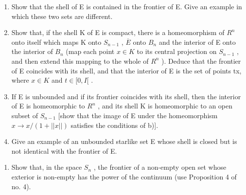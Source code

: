 \begin{enumerate}
\def\labelenumi{\alph{enumi})}
\item
  Show that the shell of E is contained in the frontier of E. Give an example in which these two sets are different.
\item
  Show that, if the shell K of E is compact, there is a homeomorphism of \(R^{n}\) onto itself which maps K onto \(S_{n-1}\) , \(\overline{E}\) onto \(B_{n}\) and the interior of E onto the interior of \(B_{n}\) (map each point \(x \in K\) to its central projection on \(S_{n-1}\) , and then extend this mapping to the whole of \(R^{n}\) ). Deduce that the frontier of E coincides with its shell, and that the interior of E is the set of points tx, where \(x \in K\) and \(t \in [0, I[\) .
\item
  If E is unbounded and if its frontier coincides with its shell, then the interior of E is homeomorphic to \(R^{n}\) , and its shell K is homeomorphic to an open subset of \(S_{n-1}\) {[}show that the image of E under the homeomorphism \(x \to x/(1 + ||x||)\) satisfies the conditions of b){]}.
\item
  Give an example of an unbounded starlike set E whose shell is closed but is not identical with the frontier of E.
\end{enumerate}

\begin{enumerate}
\def\labelenumi{\arabic{enumi})}
\setcounter{enumi}{12}
\tightlist
\item
  Show that, in the space \(S_{n}\) , the frontier of a non-empty open set whose exterior is non-empty has the power of the continuum (use Proposition 4 of no. 4).
\end{enumerate}

